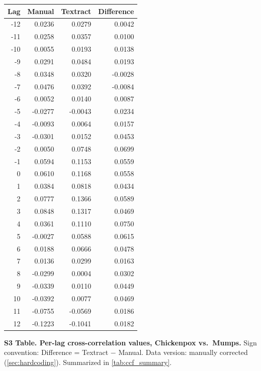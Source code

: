 \documentclass[12pt]{article}
\begin{document}
\begin{table}[h]
\centering
\begin{tabular}{rrrr}
\toprule
Lag & Manual & Textract & Difference \\
\midrule
-12 & 0.0236 & 0.0279 & 0.0042 \\
-11 & 0.0258 & 0.0357 & 0.0100 \\
-10 & 0.0055 & 0.0193 & 0.0138 \\
 -9 & 0.0291 & 0.0484 & 0.0193 \\
 -8 & 0.0348 & 0.0320 & -0.0028 \\
 -7 & 0.0476 & 0.0392 & -0.0084 \\
 -6 & 0.0052 & 0.0140 & 0.0087 \\
 -5 & -0.0277 & -0.0043 & 0.0234 \\
 -4 & -0.0093 & 0.0064 & 0.0157 \\
 -3 & -0.0301 & 0.0152 & 0.0453 \\
 -2 & 0.0050 & 0.0748 & 0.0699 \\
 -1 & 0.0594 & 0.1153 & 0.0559 \\
  0 & 0.0610 & 0.1168 & 0.0558 \\
  1 & 0.0384 & 0.0818 & 0.0434 \\
  2 & 0.0777 & 0.1366 & 0.0589 \\
  3 & 0.0848 & 0.1317 & 0.0469 \\
  4 & 0.0361 & 0.1110 & 0.0750 \\
  5 & -0.0027 & 0.0588 & 0.0615 \\
  6 & 0.0188 & 0.0666 & 0.0478 \\
  7 & 0.0136 & 0.0299 & 0.0163 \\
  8 & -0.0299 & 0.0004 & 0.0302 \\
  9 & -0.0339 & 0.0110 & 0.0449 \\
 10 & -0.0392 & 0.0077 & 0.0469 \\
 11 & -0.0755 & -0.0569 & 0.0186 \\
 12 & -0.1223 & -0.1041 & 0.0182 \\
\bottomrule
\end{tabular}
\end{table}

\bigskip
\noindent\textbf{S3 Table. Per-lag cross-correlation values, Chickenpox vs.\ Mumps.} Sign convention: Difference = Textract $-$ Manual. Data version: manually corrected (\cref{sec:hardcoding}). Summarized in \cref{tab:ccf_summary}.
\end{document}
